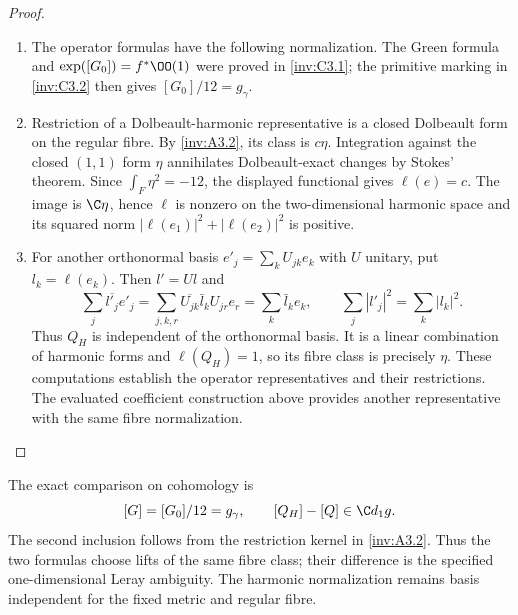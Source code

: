 \begin{proof}
\begin{enumerate}[label=\arabic*.,leftmargin=*]
\item The operator formulas have the following normalization.
The Green formula and $\exp([G_0])=f^*\OO(1)$ were proved in
\ref{inv:C3.1}; the primitive marking in \ref{inv:C3.2} then gives
$[G_0]/12=g_\gamma$.

\item Restriction of a Dolbeault-harmonic representative is a closed
Dolbeault form on the regular fibre. By \ref{inv:A3.2}, its class
is $c\eta$. Integration against the closed $(1,1)$ form $\eta$
annihilates Dolbeault-exact changes by Stokes' theorem. Since
$\int_F\eta^2=-12$, the displayed functional gives $\ell(e)=c$.
The image is $\C\eta$, hence $\ell$ is nonzero on the
 two-dimensional harmonic space and its squared norm
$|\ell(e_1)|^2+|\ell(e_2)|^2$ is positive.

\item For another orthonormal basis $e'_j=\sum_k U_{jk}e_k$ with
$U$ unitary, put $l_k=\ell(e_k)$. Then $l'=Ul$ and
\[
 \sum_j\overline{l'_j}e'_j
 =\sum_{j,k,r}\overline{U_{jk}}\bar l_k U_{jr}e_r
 =\sum_k\bar l_ke_k,
 \qquad \sum_j|l'_j|^2=\sum_k|l_k|^2.
\]
Thus $Q_H$ is independent of the orthonormal basis. It is a linear
combination of harmonic forms and $\ell(Q_H)=1$, so its fibre class
is precisely $\eta$. These computations establish the operator
representatives and their restrictions. The evaluated coefficient
construction above provides another representative with the same
fibre normalization.
\end{enumerate}
\end{proof}

The exact comparison on cohomology is
\[
 [G]=[G_0]/12=g_\gamma,\qquad
 [Q_H]-[Q]\in\C d_1g.
\]
The second inclusion follows from the restriction kernel in
\cref{inv:A3.2}.  Thus the two formulas choose lifts of the same fibre
class; their difference is the specified one-dimensional Leray
ambiguity.  The harmonic normalization remains basis independent for
the fixed metric and regular fibre.

